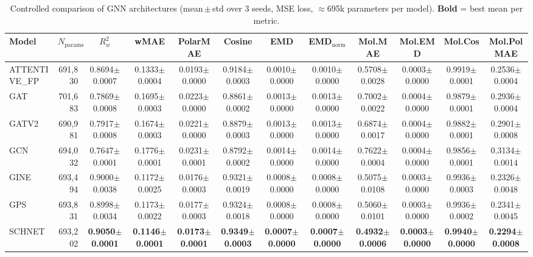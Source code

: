 \begin{table}[ht]
\centering
\caption{Controlled comparison of GNN architectures (mean\,$\pm$\,std over 3 seeds, MSE loss, $\approx$695k parameters per model). \textbf{Bold} = best mean per metric.}
\label{tab:benchmark_mse}
\small
\begin{tabular}{l r c c c c c c c c c c }
\toprule
Model & $N_{\text{params}}$ & $R^2_w$ & wMAE & PolarMAE & Cosine & EMD & EMD$_\mathrm{norm}$ & Mol.MAE & Mol.EMD & Mol.Cos & Mol.PolMAE \\
\midrule
ATTENTIVE_FP & 691,830 & 0.8694$\pm$0.0007 & 0.1333$\pm$0.0004 & 0.0193$\pm$0.0000 & 0.9184$\pm$0.0003 & 0.0010$\pm$0.0000 & 0.0010$\pm$0.0000 & 0.5708$\pm$0.0028 & 0.0003$\pm$0.0000 & 0.9919$\pm$0.0001 & 0.2536$\pm$0.0004 \\
GAT & 701,683 & 0.7869$\pm$0.0008 & 0.1695$\pm$0.0003 & 0.0223$\pm$0.0000 & 0.8861$\pm$0.0002 & 0.0013$\pm$0.0000 & 0.0013$\pm$0.0000 & 0.7002$\pm$0.0022 & 0.0004$\pm$0.0000 & 0.9879$\pm$0.0001 & 0.2936$\pm$0.0004 \\
GATV2 & 690,981 & 0.7917$\pm$0.0008 & 0.1674$\pm$0.0003 & 0.0221$\pm$0.0000 & 0.8879$\pm$0.0003 & 0.0013$\pm$0.0000 & 0.0013$\pm$0.0000 & 0.6874$\pm$0.0017 & 0.0004$\pm$0.0000 & 0.9882$\pm$0.0001 & 0.2901$\pm$0.0008 \\
GCN & 694,032 & 0.7647$\pm$0.0001 & 0.1776$\pm$0.0001 & 0.0231$\pm$0.0001 & 0.8792$\pm$0.0002 & 0.0014$\pm$0.0000 & 0.0014$\pm$0.0000 & 0.7622$\pm$0.0004 & 0.0004$\pm$0.0000 & 0.9856$\pm$0.0001 & 0.3134$\pm$0.0014 \\
GINE & 693,494 & 0.9000$\pm$0.0038 & 0.1172$\pm$0.0025 & 0.0176$\pm$0.0003 & 0.9321$\pm$0.0019 & 0.0008$\pm$0.0000 & 0.0008$\pm$0.0000 & 0.5075$\pm$0.0108 & 0.0003$\pm$0.0000 & 0.9936$\pm$0.0003 & 0.2326$\pm$0.0048 \\
GPS & 693,831 & 0.8998$\pm$0.0034 & 0.1173$\pm$0.0022 & 0.0177$\pm$0.0003 & 0.9324$\pm$0.0018 & 0.0008$\pm$0.0000 & 0.0008$\pm$0.0000 & 0.5060$\pm$0.0101 & 0.0003$\pm$0.0000 & 0.9936$\pm$0.0002 & 0.2341$\pm$0.0045 \\
SCHNET & 693,202 & \textbf{0.9050$\pm$0.0001} & \textbf{0.1146$\pm$0.0001} & \textbf{0.0173$\pm$0.0001} & \textbf{0.9349$\pm$0.0003} & \textbf{0.0007$\pm$0.0000} & \textbf{0.0007$\pm$0.0000} & \textbf{0.4932$\pm$0.0006} & \textbf{0.0003$\pm$0.0000} & \textbf{0.9940$\pm$0.0000} & \textbf{0.2294$\pm$0.0008} \\
\bottomrule
\end{tabular}
\end{table}
